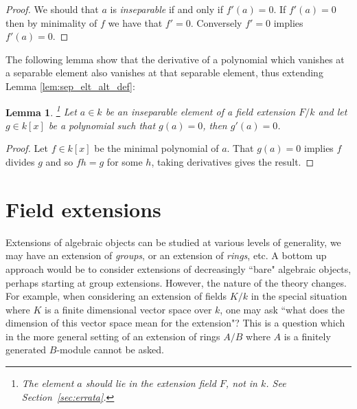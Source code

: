 \documentclass[12pt]{article}
\theoremstyle{plain}
\newtheorem{lemma}[thm]{Lemma}
\theoremstyle{definition}
\begin{document}
\begin{proof}
We should that $a$ is \emph{inseparable} if and only if $f'(a) = 0$. If $f'(a) = 0$ then by minimality of $f$ we have that $f' = 0$. Conversely $f' = 0$ implies $f'(a) = 0$.
\end{proof}
%
The following lemma show that the derivative of a polynomial which vanishes at a separable element also vanishes at that separable element, thus extending Lemma \ref{lem:sep_elt_alt_def}:
\begin{lemma}
\label{lem:seemingly_useless}\footnote{The element $a$ should lie in the extension field $F$, not in $k$. See Section~\ref{sec:errata}.}
Let $a \in k$ be an inseparable element of a field extension $F/k$ and let $g \in k[x]$ be a polynomial such that $g(a) = 0$, then $g'(a) = 0$.
\end{lemma}
\begin{proof}
Let $f \in k[x]$ be the minimal polynomial of $a$. That $g(a) = 0$ implies $f$ divides $g$ and so $fh = g$ for some $h$, taking derivatives gives the result.
\end{proof}
\section{Field extensions}
Extensions of algebraic objects can be studied at various levels of generality, we may have an extension of \emph{groups}, or an extension of \emph{rings}, etc. A bottom up approach would be to consider extensions of decreasingly ``bare" algebraic objects, perhaps starting at group extensions. However, the nature of the theory changes. For example, when considering an extension of fields $K/k$ in the special situation where $K$ is a finite dimensional vector space over $k$, one may ask ``what does the dimension of this vector space mean for the extension"? This is a question which in the more general setting of an extension of rings $A/B$ where $A$ is a finitely generated $B$-module cannot be asked.
\end{document}
